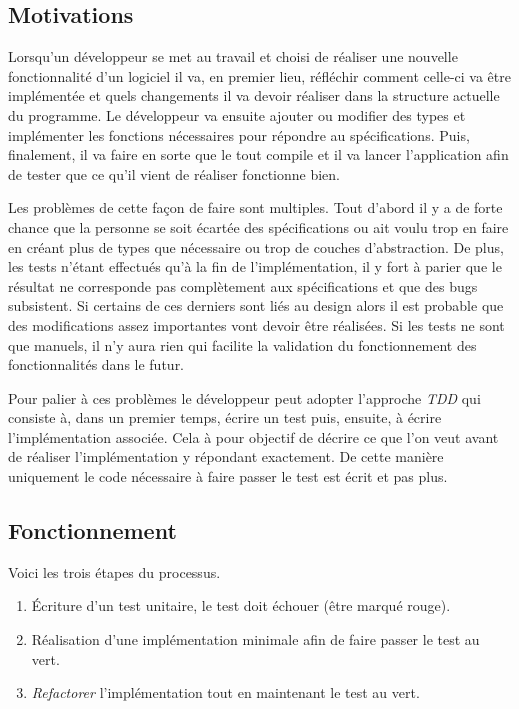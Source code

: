 \documentclass[journal, a4paper, frenchb]{IEEEtran}
\begin{document}
\subsection{Motivations}

Lorsqu'un développeur se met au travail et choisi de réaliser une nouvelle fonctionnalité d'un logiciel il va, en premier lieu, réfléchir comment celle-ci va être implémentée et quels changements il va devoir réaliser dans la structure actuelle du programme. Le développeur va ensuite ajouter ou modifier des types et implémenter les fonctions nécessaires pour répondre au spécifications. Puis, finalement, il va faire en sorte que le tout compile et il va lancer l'application afin de tester que ce qu'il vient de réaliser fonctionne bien.

Les problèmes de cette façon de faire sont multiples. Tout d'abord il y a de forte chance que la personne se soit écartée des spécifications ou ait voulu trop en faire en créant plus de types que nécessaire ou trop de couches d'abstraction. De plus, les tests n'étant effectués qu'à la fin de l'implémentation, il y fort à parier que le résultat ne corresponde pas complètement aux spécifications et que des bugs subsistent. Si certains de ces derniers sont liés au design alors il est probable que des modifications assez importantes vont devoir être réalisées. Si les tests ne sont que manuels, il n'y aura rien qui facilite la validation du fonctionnement des fonctionnalités dans le futur.

Pour palier à ces problèmes le développeur peut adopter l'approche \emph{TDD} qui consiste à, dans un premier temps, écrire un test puis, ensuite, à écrire l'implémentation associée. Cela à pour objectif de décrire ce que l'on veut avant de réaliser l'implémentation y répondant exactement. De cette manière uniquement le code nécessaire à faire passer le test est écrit et pas plus.


\subsection{Fonctionnement}

Voici les trois étapes du processus.

\begin{enumerate}
   \item Écriture d'un test unitaire, le test doit échouer (être marqué rouge).
   \item Réalisation d'une implémentation minimale afin de faire passer le test au vert.
   \item \emph{Refactorer} l'implémentation tout en maintenant le test au vert.
\end{enumerate}
\end{document}
